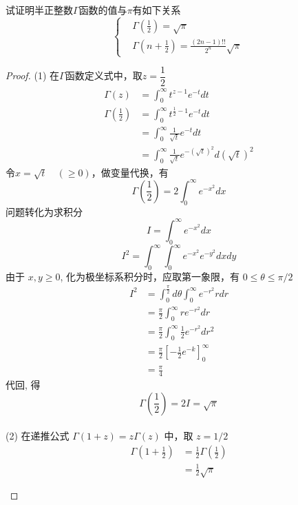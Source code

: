 	\begin{example}
		试证明半正整数$\Gamma$函数的值与$\pi$有如下关系
	\begin{equation}
		\left\{
		\begin{aligned}
			&\Gamma(\frac{1}{2}) =\sqrt{\pi} \\ 
			&\Gamma(n+\frac{1}{2}) = \frac{(2n-1)!!}{2^n} \sqrt{\pi}
		\end{aligned}\right.	
	\end{equation}
	\end{example}
	\begin{proof}
		(1) 在$\Gamma$函数定义式中，取$z=\dfrac{1}{2}$
		\[
			\begin{aligned}
				 \Gamma(z)&=\int_{0}^{\infty} t^{ z-1} e^{-t} dt \\
				 \Gamma(\frac{1}{2})&=\int_{0}^{\infty} t^{\frac{1}{2}-1} e^{-t} dt\\
				 &=\int_{0}^{\infty} \frac{1}{\sqrt{t}} e^{-t} dt\\
				 &=\int_{0}^{\infty} \frac{1}{\sqrt{t}} e^{-(\sqrt{t})^2} d(\sqrt{t})^2
			\end{aligned}	
			\]
			令$x=\sqrt{t} \quad (\ge 0) $，做变量代换，有
			\[\Gamma(\frac{1}{2})
			=2\int_{0}^{\infty} e^{-x^2} dx\]
			问题转化为求积分
			\[I=\int_{0}^{\infty} e^{-x^2} dx\]
			\[I^2=\int_{0}^{\infty} \int_{0}^{\infty} e^{-x^2} e^{-y^2} dxdy\]
			由于 $x,y \ge 0$, 化为极坐标系积分时，应取第一象限，有 $0 \le \theta \le \pi/2$
			\[
			\begin{aligned}
					I^2
					 &=\int_{0}^{\frac{\pi}{2}}d\theta \int_{0}^{\infty}  e^{-r^2} r dr \\
					 &=\frac{\pi}{2} \int_{0}^{\infty} r e^{-r^2} dr \\
					 &=\frac{\pi}{2} \int_{0}^{\infty} \frac{1}{2} e^{-r^2} dr^2 \\
					 &=\frac{\pi}{2}\left[-\frac{1}{2} e^{-k}\right]_{0}^{\infty} \\
					 &=\frac{\pi}{4}
				\end{aligned}	
				\] 
		代回, 得 
		\[\Gamma(\frac{1}{2})
			=2I = \sqrt{\pi} \]
		 \\
		(2) 在递推公式 $\Gamma(1+z)=z \Gamma(z) $ 中，取 $z = 1/2$\\
		\[
			\begin{aligned}
				\Gamma(1+\frac{1}{2})&= \frac{1}{2} \Gamma(\frac{1}{2}) \\
				&=\frac{1}{2} \sqrt{\pi}\\
			\end{aligned} 
			  \]
		  \[
		\begin{aligned}

\end{aligned}\]
\end{proof}
